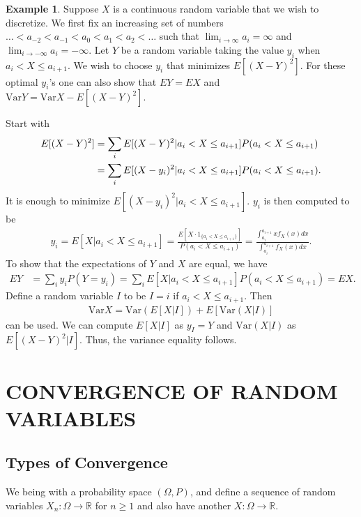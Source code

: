 \documentclass[15pt,a4paper]{book}
\theoremstyle{definition}
\newtheorem{example}[theorem]{Example}
\newcommand{\R}{\mathbb{R}}
\newcommand{\Var}{\text{Var}}
\begin{document}
\begin{example}
    Suppose $X$ is a continuous random variable that we wish to discretize. We first fix an increasing set of numbers $\ldots < a_{-2} < a_{-1} < a_{0} < a_{1} < a_{2} < \ldots$ such that $\lim_{i \to \infty} a_{i} = \infty$ and $\lim_{i \to -\infty} a_{i} = -\infty$. Let $Y$ be a random variable taking the value $y_{i}$ when $a_{i} < X \leq a_{i+1}$. We wish to choose $y_{i}$ that minimizes $E[(X-Y)^{2}]$. For these optimal $y_{i}$'s one can also show that $EY = EX$ and $\Var Y = \Var X - E[(X-Y)^{2}]$.

    Start with
    \begin{align}
        E[(X-Y)^{2}] &= \sum_{i} E[(X-Y)^{2} | a_{i} < X \leq a_{i+1}] P(a_{i} < X \leq a_{i+1}) \\
        &= \sum_{i} E[(X-y_{i})^{2} | a_{i} < X \leq a_{i+1}] P(a_{i} < X \leq a_{i+1}) \notag.
    \end{align}
    It is enough to minimize $E[(X-y_{i})^{2}|a_{i} < X \leq a_{i+1}]$. $y_{i}$ is then computed to be
    \begin{align}
        y_{i} = E[X|a_{i} < X \leq a_{i+1}] = \frac{E[X \cdot 1_{\{a_{i} < X \leq a_{i+1}\}}]}{P(a_{i} < X \leq a_{i+1})} = \frac{\int_{a_{i}}^{a_{i+1}} x f_{X}(x) dx}{\int_{a_{i}}^{a_{i+1}} f_{X}(x) dx}.
    \end{align}
    To show that the expectations of $Y$ and $X$ are equal, we have
    \begin{align}
        EY &= \sum_{i} y_{i} P(Y = y_{i}) = \sum_{i} E[X|a_{i} < X \leq a_{i+1}] P(a_{i} < X \leq a_{i+1}) = EX.
    \end{align}
    Define a random variable $I$ to be $I = i$ if $a_{i} < X \leq a_{i+1}$. Then
    \begin{align}
        \Var X = \Var(E[X|I]) + E[\Var (X|I)]
    \end{align}
    can be used. We can compute $E[X|I]$ as $y_{I} = Y$ and $\Var(X|I)$ as $E[(X-Y)^{2}|I]$. Thus, the variance equality follows.
\end{example}

\chapter{CONVERGENCE OF RANDOM VARIABLES}

\section{Types of Convergence}
We being with a probability space $(\Omega, P)$, and define a sequence of random variables $X_{n}:\Omega \to \R$ for $n \geq 1$ and also have another $X:\Omega \to \R$.
\end{document}

